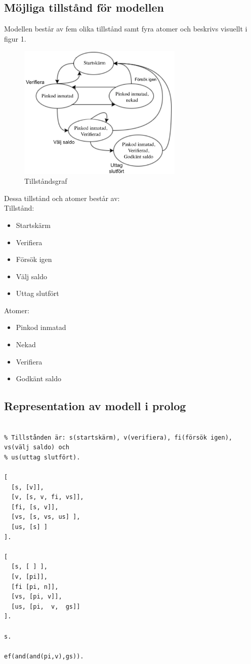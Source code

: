 \documentclass[]{article}
\begin{document}
\subsection{Möjliga tillstånd för modellen}
Modellen består av fem olika tillstånd samt fyra atomer och beskrivs visuellt i figur 1. 
\begin{figure}[h]
\centering
\includegraphics[width=0.7\textwidth]{modell.png}
\caption{Tillståndsgraf}
\end{figure}

Dessa tillstånd och atomer består av:\\

Tillstånd:
\begin{itemize}
  \item Startskärm
  \item Verifiera
  \item Försök igen
  \item Välj saldo
  \item Uttag slutfört
\end{itemize}

Atomer:
\begin{itemize}
  \item Pinkod inmatad
  \item Nekad
  \item Verifiera
  \item Godkänt saldo
\end{itemize}

\clearpage

\subsection{Representation av modell i prolog}

\begin{verbatim}

% Tillstånden är: s(startskärm), v(verifiera), fi(försök igen), vs(välj saldo) och 
% us(uttag slutfört).

[
  [s, [v]],
  [v, [s, v, fi, vs]], 
  [fi, [s, v]],
  [vs, [s, vs, us] ],
  [us, [s] ]
].

[
  [s, [ ] ],
  [v, [pi]],
  [fi [pi, n]],
  [vs, [pi, v]],
  [us, [pi,  v,  gs]]
].

s.

ef(and(and(pi,v),gs)).

\end{verbatim}
\end{document}
